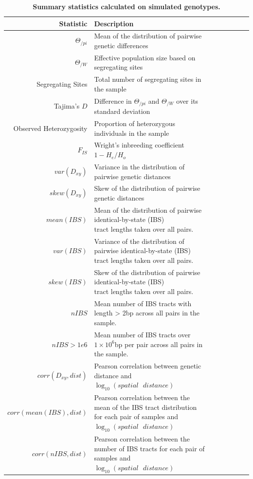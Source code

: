\documentclass[10pt,twoside,lineno,hidelinks]{preprint}
\begin{document}
\begin{table}
\small
\centering
\caption{\bf Summary statistics calculated on simulated genotypes.}
\begin{tabular}{rllrrrrr}
  \hline
Statistic & Description \\ 
  \hline
$\Theta_{/pi}$ & Mean of the distribution of pairwise genetic differences \\
$\Theta_{/W}$ & Effective population size based on segregating sites \\
Segregating Sites & Total number of segregating sites in the sample \\
Tajima's $D$ & Difference in $\Theta_{/pi}$ and $\Theta_{/W}$ over its standard deviation\\
Observed Heterozygosity & Proportion of heterozygous individuals in the sample \\
$F_{IS}$ & Wright's inbreeding coefficient $1-H_{e}/H_{o}$ \\
$var(D_{xy})$ & Variance in the distribution of pairwise genetic distances \\
$skew(D_{xy})$ & Skew of the distribution of pairwise genetic distances \\
$mean(IBS)$ & \makecell[l]{Mean of the distribution of pairwise identical-by-state (IBS) \\tract lengths taken over all pairs.} \\
$var(IBS)$ & \makecell[l]{Variance of the distribution of pairwise identical-by-state (IBS) \\tract lengths taken over all pairs.} \\
$skew(IBS)$ & \makecell[l]{Skew of the distribution of pairwise identical-by-state (IBS) \\tract lengths taken over all pairs.} \\
$nIBS$ & Mean number of IBS tracts with length > 2bp across all pairs in the sample. \\
$nIBS>1e6$ & \makecell[l]{Mean number of IBS tracts over $1\times10^6$bp per pair \\across all pairs in the sample.} \\ 
$corr(D_{xy},dist)$ & Pearson correlation between genetic distance and $\log_{10}(spatial\text{ }distance)$ \\
$corr(mean(IBS),dist)$ & \makecell[l]{Pearson correlation between the mean of the IBS tract distribution \\for each pair of samples and $\log_{10}(spatial\text{ }distance)$} \\
$corr(nIBS,dist)$ & \makecell[l]{Pearson correlation between the number of IBS tracts \\for each pair of samples and $\log_{10}(spatial\text{ }distance)$} \\

\end{tabular}
\end{table}
\end{document}
